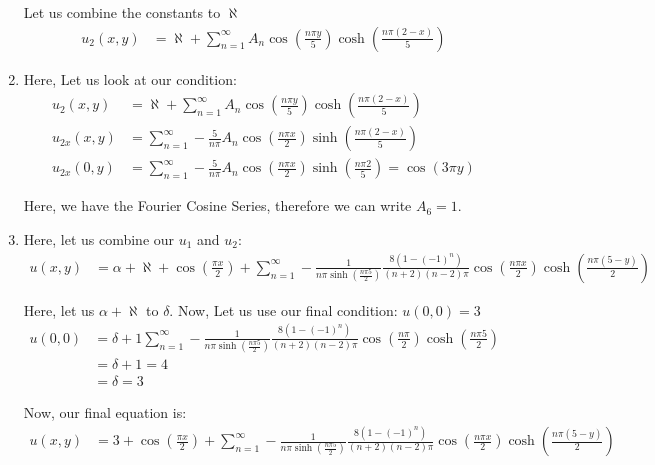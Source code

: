 \begin{enumerate}
Let us combine the constants to $\aleph$
\begin{align}
  u_{2}(x, y) & = \aleph + \sum^\infty_{n = 1} A_n \cos\left(\frac{n \pi y}{5}\right) \cosh\left(\frac{n \pi(2 - x)}{5}\right)
\end{align}


\item Here, Let us look at our condition:
%
\begin{align}
  u_{2}(x, y) & = \aleph + \sum^\infty_{n = 1} A_n\cos\left(\frac{n \pi y}{5}\right) \cosh\left(\frac{n \pi(2 - x)}{5}\right)\\
  u_{2x}(x, y) & =
  \sum^\infty_{n = 1}
  - \frac{5}{n \pi} A_n\cos\left(\frac{n \pi x}{2}\right)
  \sinh\left(\frac{n \pi(2 - x)}{5}\right)\\
  u_{2x}(0, y) & =
  \sum^\infty_{n = 1}
  - \frac{5}{n \pi} A_n\cos\left(\frac{n \pi x}{2}\right)
  \sinh\left(\frac{n \pi 2}{5}\right) = \cos(3 \pi y)
\end{align}

Here, we have the Fourier Cosine Series, therefore we can write $A_6 = 1$.


\item Here, let us combine our $u_1$ and $u_2$:
%
\begin{align}
  u(x, y) & = \alpha + \aleph + \cos \left(\frac{\pi x}{2}\right) +
  \sum^\infty_{n = 1}
  - \frac{1}{n \pi \sinh \left(\frac{n \pi 5}{2}\right)}
  \frac{8 (1 - (-1)^n)}{(n + 2)(n - 2) \pi} \cos\left(\frac{n \pi x}{2}\right) \cosh\left( \frac{n \pi(5 - y)}{2}\right)
\end{align}

Here, let us $\alpha + \aleph$ to $\delta$. Now, Let us use our final condition: $u(0, 0) = 3$
%
\begin{align}
  u(0, 0) & = \delta + 1
  \sum^\infty_{n = 1}
  - \frac{1}{n \pi \sinh \left(\frac{n \pi 5}{2}\right)}
  \frac{8 (1 - (-1)^n)}{(n + 2)(n - 2) \pi} \cos\left(\frac{n \pi}{2}\right) \cosh\left( \frac{n \pi 5}{2}\right)\\
  & = \delta + 1 = 4\\
  & = \delta = 3
\end{align}

Now, our final equation is:
%
\begin{align}
  u(x, y) & = 3 + \cos \left(\frac{\pi x}{2}\right) +
  \sum^\infty_{n = 1}
  - \frac{1}{n \pi \sinh \left(\frac{n \pi 5}{2}\right)}
  \frac{8 (1 - (-1)^n)}{(n + 2)(n - 2) \pi} \cos\left(\frac{n \pi x}{2}\right) \cosh\left( \frac{n \pi(5 - y)}{2}\right)
\end{align}
\end{enumerate}
